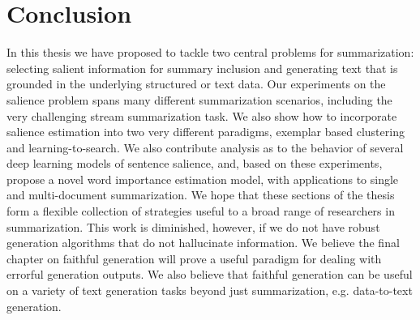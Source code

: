 \section{Conclusion}

In this thesis we have proposed to tackle two central problems for 
summarization: selecting salient information for summary inclusion and
generating text that is grounded in the underlying structured or text data. 
Our experiments on the salience problem spans many different summarization
scenarios, including the very challenging stream summarization task.
We also show how to incorporate salience estimation into two very different
paradigms, exemplar based clustering and learning-to-search.
We also contribute analysis as to the behavior of several deep learning models
of sentence salience, and,  based on these experiments, propose a novel
word importance estimation model, with applications to single and 
multi-document summarization. We hope that these sections of the thesis
form a flexible collection of strategies useful to a broad range of 
researchers in summarization. This work is diminished, however,
if we do not
have robust generation algorithms that do not hallucinate information.
We believe the final chapter on faithful generation will prove a useful 
paradigm for dealing with errorful generation outputs. We also believe
that faithful generation can be useful on a variety of text generation tasks
beyond just summarization, e.g. data-to-text generation.

